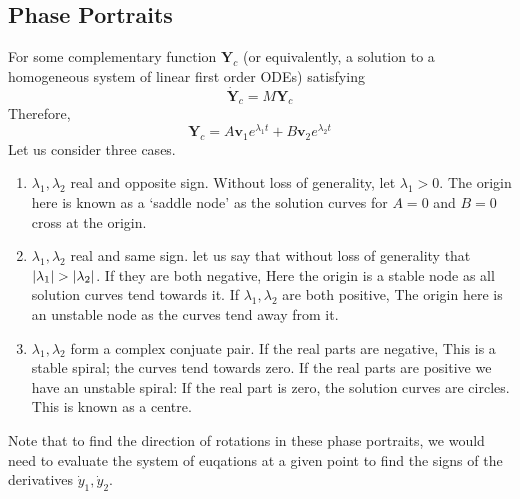\documentclass{article}
\begin{document}
\subsection{Phase Portraits}
For some complementary function $\bm Y_c$ (or equivalently, a solution to a homogeneous system of linear first order ODEs) satisfying
\begin{equation}\label{phasematrix}
	\dot {\bm Y}_c = M\bm Y_c
\end{equation}
Therefore,
\[ \bm Y_c = A\bm v_1 e^{\lambda_1 t} + B\bm v_2 e^{\lambda_2 t} \]
Let us consider three cases.
\begin{enumerate}
	\item $\lambda_1, \lambda_2$ real and opposite sign. Without loss of generality, let $\lambda_1 > 0$. %
	      The origin here is known as a `saddle node' as the solution curves for $A=0$ and $B=0$ cross at the origin.
	\item $\lambda_1, \lambda_2$ real and same sign. let us say that without loss of generality that $\abs{\lambda_1} > \abs{\lambda_2}$. If they are both negative, %
	      Here the origin is a stable node as all solution curves tend towards it. If $\lambda_1, \lambda_2$ are both positive, %
	      The origin here is an unstable node as the curves tend away from it.
	\item $\lambda_1, \lambda_2$ form a complex conjuate pair. If the real parts are negative, %
	      This is a stable spiral; the curves tend towards zero. If the real parts are positive we have an unstable spiral:
	      If the real part is zero, the solution curves are circles. This is known as a centre. %
\end{enumerate}
Note that to find the direction of rotations in these phase portraits, we would need to evaluate the system of euqations at a given point to find the signs of the derivatives $\dot y_1, \dot y_2$.
\end{document}

